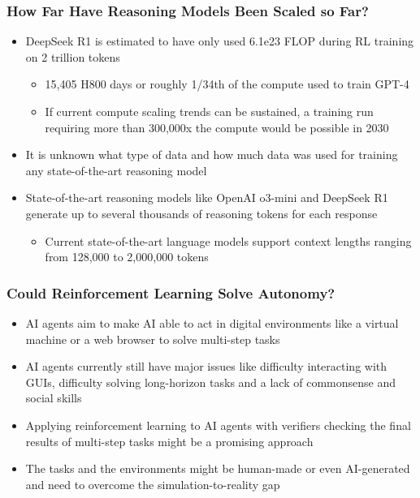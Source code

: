 \documentclass[aspectratio=169]{beamer}
\begin{document}
    \begin{frame}
        \frametitle{How Far Have Reasoning Models Been Scaled so Far?}
        \begin{itemize}
            \item DeepSeek R1 is estimated to have only used 6.1e23 FLOP during RL training on 2 trillion tokens~\parencite{erdil_deepseek_2025}
            \begin{itemize}
                \item 15,405 H800 days or roughly 1/34th of the compute used to train GPT-4
                \item If current compute scaling trends can be sustained, a training run requiring more than 300,000x the compute would be possible in 2030
            \end{itemize}
            \item It is unknown what type of data and how much data was used for training any state-of-the-art reasoning model
            \item State-of-the-art reasoning models like OpenAI o3-mini and DeepSeek R1 generate up to several thousands of reasoning tokens for each response
            \begin{itemize}
                \item Current state-of-the-art language models support context lengths ranging from 128,000 to 2,000,000 tokens
            \end{itemize}
        \end{itemize}
    \end{frame}
    \begin{frame}
        \frametitle{Could Reinforcement Learning Solve Autonomy?}
        \begin{itemize}
            \item AI agents aim to make AI able to act in digital environments like a virtual machine or a web browser to solve multi-step tasks
            \item AI agents currently still have major issues like difficulty interacting with GUIs, difficulty solving long-horizon tasks and a lack of commonsense and social skills~\parencite{xu2024theagentcompanybenchmarkingllmagents}
            \item Applying reinforcement learning to AI agents with verifiers checking the final results of multi-step tasks might be a promising approach~\parencite{pan2024trainingsoftwareengineeringagents}
            \item The tasks and the environments might be human-made or even AI-generated~\parencite{hu2024agentgenenhancingplanningabilities} and need to overcome the simulation-to-reality gap
        \end{itemize}
    \end{frame}
\end{document}
